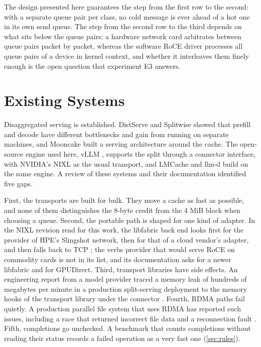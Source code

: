 The design presented here guarantees the step from the first row to the
second: with a separate queue pair per class, no cold message is ever ahead of
a hot one in its own send queue. The step from the second row to the third depends on what sits below the
queue pairs: a hardware network card arbitrates between queue pairs packet by
packet, whereas the software RoCE driver processes all queue pairs of a
device in kernel context, and whether it interleaves them finely enough is
the open question that experiment E3 answers.

\section{Existing Systems}

Disaggregated serving is established. DistServe \citep{zhong2024distserve} and
Splitwise \citep{patel2024splitwise} showed that prefill and decode have
different bottlenecks and gain from running on separate machines, and Mooncake
\citep{qin2024mooncake} built a serving architecture around the cache. The
open-source engine used here, vLLM \citep{kwon2023vllm,vllm_repo}, supports
the split through a connector interface, with NVIDIA's NIXL \citep{nixl} as
the usual transport, and LMCache \citep{lmcache_blog} and llm-d \citep{llmd}
build on the same engine. A review of these systems and their documentation identified five gaps.

First, the transports are built for bulk. They move a cache as fast as
possible, and none of them distinguishes the 8-byte credit from the 4 MiB
block when choosing a queue. Second, the portable path is shaped for one kind
of adapter. In the NIXL revision read for this work, the libfabric back end
looks first for the provider of HPE's Slingshot network, then for that of a
cloud vendor's adapter, and then falls back to TCP \citep{nixl}; the verbs
provider that would serve RoCE on commodity cards is not in its list, and its
documentation asks for a newer libfabric and for GPUDirect. Third, transport
libraries have side effects. An engineering report from a model provider
traced a memory leak of hundreds of megabytes per minute in a production
split-serving deployment to the memory hooks of the transport library under
the connector \citep{mistral2026leak}. Fourth, RDMA paths fail quietly. A
production parallel file system that uses RDMA has reported such issues,
including a race that returned incorrect file data \citep{ibm_ij44629} and a
reconnection fault \citep{ibm_iv61625}. Fifth, completions go unchecked. A
benchmark that counts completions without reading their status records a
failed operation as a very fast one (\cref{sec:rules}).

